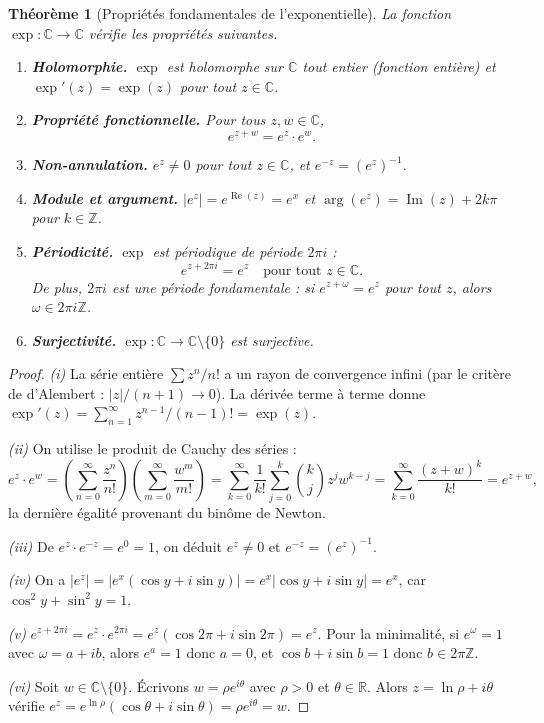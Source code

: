 \documentclass[12pt,a4paper,openany]{book}
\theoremstyle{definition}
\theoremstyle{plain}
\newtheorem{theoreme}[definition]{Théorème}
\theoremstyle{remark}
\newcommand{\C}{\mathbb{C}}
\newcommand{\R}{\mathbb{R}}
\newcommand{\Z}{\mathbb{Z}}
\DeclareMathOperator{\re}{Re}
\DeclareMathOperator{\im}{Im}
\newcommand{\abs}[1]{\left|#1\right|}
\begin{document}
\begin{theoreme}[Propriétés fondamentales de l'exponentielle]\label{thm:proprietes-exp}
La fonction $\exp : \C \to \C$ vérifie les propriétés suivantes.
\begin{enumerate}[label=(\roman*)]
  \item \textbf{Holomorphie.} $\exp$ est holomorphe sur $\C$ tout entier (fonction entière) et $\exp'(z) = \exp(z)$ pour tout $z \in \C$.
  \item \textbf{Propriété fonctionnelle.} Pour tous $z, w \in \C$,
  \[
    e^{z+w} = e^z \cdot e^w.
  \]
  \item \textbf{Non-annulation.} $e^z \neq 0$ pour tout $z \in \C$, et $e^{-z} = (e^z)^{-1}$.
  \item \textbf{Module et argument.} $\abs{e^z} = e^{\re(z)} = e^x$ et $\arg(e^z) = \im(z) + 2k\pi$ pour $k \in \Z$.
  \item \textbf{Périodicité.} $\exp$ est périodique de période $2\pi i$ :
  \[
    e^{z + 2\pi i} = e^z \quad \text{pour tout } z \in \C.
  \]
  De plus, $2\pi i$ est une période fondamentale : si $e^{z+\omega} = e^z$ pour tout $z$, alors $\omega \in 2\pi i \Z$.
  \item \textbf{Surjectivité.} $\exp : \C \to \C \setminus \{0\}$ est surjective.
\end{enumerate}
\end{theoreme}

\begin{proof}
\emph{(i)} La série entière $\sum z^n/n!$ a un rayon de convergence infini (par le critère de d'Alembert : $\abs{z}/(n+1) \to 0$). La dérivée terme à terme donne $\exp'(z) = \sum_{n=1}^{\infty} z^{n-1}/(n-1)! = \exp(z)$.

\medskip

\emph{(ii)} On utilise le produit de Cauchy des séries :
\[
  e^z \cdot e^w = \left(\sum_{n=0}^{\infty} \frac{z^n}{n!}\right)
                  \left(\sum_{m=0}^{\infty} \frac{w^m}{m!}\right)
               = \sum_{k=0}^{\infty} \frac{1}{k!}\sum_{j=0}^{k} \binom{k}{j} z^j w^{k-j}
               = \sum_{k=0}^{\infty} \frac{(z+w)^k}{k!} = e^{z+w},
\]
la dernière égalité provenant du binôme de Newton.

\medskip

\emph{(iii)} De $e^z \cdot e^{-z} = e^0 = 1$, on déduit $e^z \neq 0$ et $e^{-z} = (e^z)^{-1}$.

\medskip

\emph{(iv)} On a $\abs{e^z} = \abs{e^x(\cos y + i\sin y)} = e^x \abs{\cos y + i\sin y} = e^x$, car $\cos^2 y + \sin^2 y = 1$.

\medskip

\emph{(v)} $e^{z+2\pi i} = e^z \cdot e^{2\pi i} = e^z(\cos 2\pi + i\sin 2\pi) = e^z$. Pour la minimalité, si $e^\omega = 1$ avec $\omega = a + ib$, alors $e^a = 1$ donc $a = 0$, et $\cos b + i\sin b = 1$ donc $b \in 2\pi\Z$.

\medskip

\emph{(vi)} Soit $w \in \C \setminus \{0\}$. Écrivons $w = \rho e^{i\theta}$ avec $\rho > 0$ et $\theta \in \R$. Alors $z = \ln\rho + i\theta$ vérifie $e^z = e^{\ln\rho}(\cos\theta + i\sin\theta) = \rho e^{i\theta} = w$.
\end{proof}
\end{document}
